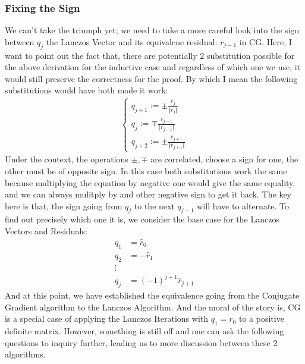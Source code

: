 \documentclass[]{article}
\theoremstyle{definition}
\begin{document}
        \subsubsection{Fixing the Sign}
            We can't take the triumph yet; we need to take a more careful look into the sign between $q_j$ the Lanczos Vector and its equivalcne residual: $r_{j - 1}$ in CG. Here, I want to point out the fact that, there are potentially 2 substitution possible for the above derivation for the inductive case and regardless of which one we use, it would still preserve the correctness for the proof. By which I mean the following substitutions would have both made it work: 
            \begin{align}
                \begin{cases}
                    q_{j + 1} := \pm \frac{r_j}{\Vert r_j\Vert}
                    \\
                    q_{j} := \mp \frac{r_{j - 1}}{\Vert r_{j - 1}\Vert}
                    \\
                    q_{j + 2} := \pm \frac{r_{j + 1}}{\Vert r_{j + 1}\Vert}
                \end{cases}
            \end{align}
            Under the context, the operations $\pm, \mp$ are correlated, choose a sign for one, the other must be of opposite sign. In this case both substitutions work the same because multiplying the equation by negative one would give the same equality, and we can always mulitply by and other negative sign to get it back. The key here is that, the sign going from $q_{j}$ to the next $q_{j - 1}$ will have to alternate. To find out precisely which one it is, we consider the base case for the Lanczos Vectors and Residuals: 
            \begin{align}
                q_1 &= \hat r_0\\
                q_2 &= -\hat r_1
                \\
                \vdots
                \\
                q_j &= (-1)^{j + 1}\hat r_{j + 1}
            \end{align}
            And at this point, we have established the equivalence going from the Conjugate Gradient algorithm to the Lanczos Algorithm. And the moral of the story is, CG is a special case of applying the Lanczos Iterations with $q_1 = r_0$ to a positive definite matrix. However, something is still off and one can ask the following questions to inquiry further, leading us to more discussion between these 2 algorithms. 
\end{document}
